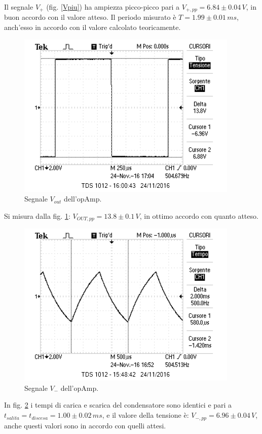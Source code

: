 \documentclass[10pt,a4paper]{article}
\begin{document}
Il segnale $V_{+}$ (fig. \ref{Vpiu}) ha ampiezza picco-picco pari a $V_{+, pp} = 6.84 \pm 0.04\, V$, in buon accordo con il valore atteso. Il periodo misurato è $T = 1.99 \pm 0.01 \, ms$, anch'esso in accordo con il valore calcolato teoricamente.


\begin{figure}[htb!]
\centering
\includegraphics[scale=1.0]{immagini/multivibratoreVOUT.png}
\caption{Segnale $V_{out}$ dell'opAmp.}
\label{Vout}
\end{figure}

Si misura dalla fig. \ref{Vout}: $V_{OUT, pp} = 13.8 \pm 0.1\, V$, in ottimo accordo con quanto atteso.

\begin{figure}[htb!]
\centering
\includegraphics[scale=1.0]{immagini/multivibratoreVMENO.png}
\caption{Segnale $V_{-}$ dell'opAmp.}
\label{Vmeno}
\end{figure}

In fig. \ref{Vmeno} i tempi di carica e scarica del condensatore sono identici e pari a $t_{salita} = t_{discesa} = 1.00 \pm 0.02\, ms$, e il valore della tensione è: $V_{-, pp} = 6.96 \pm 0.04 \, V$, anche questi valori sono in accordo con quelli attesi.
\end{document}
